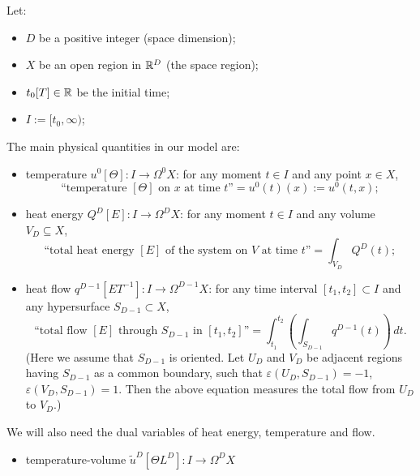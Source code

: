 \begin{discussion}
  \label{idec/heat_transport/continuous/model_with_differential_forms-discussion}
  Let:
  \begin{itemize}
    \item
      $D$ be a positive integer (space dimension);
    \item
      $X$ be an open region in $\mathbb{R}^D$ (the space region);
    \item
      $t_0 [T] \in \mathbb{R}$ be the initial time;
    \item
      $I := [t_0, \infty)$;
  \end{itemize}
  The main physical quantities in our model are:
  \begin{itemize}
    \item
      temperature $u^0 [\Theta] \colon I \to \Omega^0 X$:
      for any moment $t \in I$ and any point $x \in X$,
      \begin{equation}
        \text{``temperature $[\Theta]$ on $x$ at time $t$''}
        = u^0(t)(x) := u^0(t, x);
      \end{equation}
    \item
      heat energy $Q^D [E] \colon I \to \Omega^D X$:
      for any moment $t \in I$ and any volume $V_D \subseteq X$,
      \begin{equation}
        \text{``total heat energy $[E]$ of the system on $V$ at time $t$''}
        = \int_{V_D} Q^D(t);
      \end{equation}
    \item
      heat flow $q^{D - 1} [E T^{-1}] \colon I \to \Omega^{D - 1} X$:
      for any time interval $[t_1, t_2] \subset I$
      and any hypersurface $S_{D - 1} \subset X$,
      \begin{equation}
        \text{``total flow $[E]$ through $S_{D - 1}$ in $[t_1, t_2]$''}
        = \int_{t_1}^{t_2}\left(\int_{S_{D - 1}} q^{D - 1}(t)\right)\, d t.
      \end{equation}
      (Here we assume that $S_{D - 1}$ is oriented.
       Let $U_D$ and $V_D$ be adjacent regions having $S_{D - 1}$ as a common
       boundary, such that $\varepsilon(U_D, S_{D - 1}) = -1$, 
       $\varepsilon(V_D, S_{D - 1}) = 1$.
       Then the above equation measures the total flow from $U_D$ to $V_D$.)
  \end{itemize}
  We will also need the dual variables of heat energy, temperature and flow.
  \begin{itemize}
    \item
      temperature-volume $\tilde{u}^D [\Theta L^D] \colon I \to \Omega^D X$

\end{itemize}
\end{discussion}
